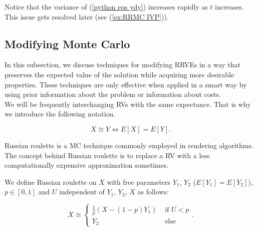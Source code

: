 \documentclass[a4paper,12pt]{article}
\begin{document}
Notice that the variance of (\ref{python eps ydy})
increases rapidly as $t$ increases. This issue gets resolved
later (see (\ref{ex:RRMC IVP})).

\subsection{Modifying Monte Carlo}

In this subsection, we discuss techniques for modifying RRVEs
in a way that preserves the expected value of the solution while
acquiring more desirable properties. These techniques are only
effective when applied in a smart way by using prior information
about the problem or information about costs. \\

We will be frequently interchanging RVs with the same expectance.
That is why we introduce the following notation.
\begin{notation}[$\cong$]
    \[
        X \cong Y \iff E[X]=E[Y]
        .\]
\end{notation}

Russian roulette is a MC technique commonly employed in rendering algorithms.
The concept behind Russian roulette is to replace a RV with a
less computationally expensive approximation sometimes.

\begin{definition} \label{Russian roulette}
    We define Russian roulette on $X$ with free parameters
    $Y_{1}$, $Y_{2}$ ($E[Y_{1}] = E[Y_{2}]$), $p \in [0,1]$
    and $U$ independent of $Y_{1}$, $Y_{2}$, $X$
    as follows:

    \begin{equation}
        X \cong
        \begin{cases}
            \frac{1}{p}(X - (1-p)Y_{1}) & \text{ if } U < p \\
            Y_{2}                       & \text{ else }
        \end{cases}.
    \end{equation}
\end{definition}
\end{document}

